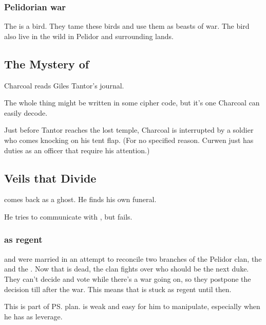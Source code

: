 \begin{garbage}
\subsubsection{Pelidorian war \grulcans}
The  is a \hs{\grulcan} bird. They tame these birds and use them as beasts of war. The bird also live in the wild in Pelidor and surrounding lands. 













\subsection{The Mystery of \EreshKal}
Charcoal reads Giles Tantor's journal. 

The whole thing might be written in some cipher code, but it's one Charcoal can easily decode. 

Just before Tantor reaches the lost temple, Charcoal is interrupted by a soldier who comes knocking on his tent flap. (For no specified reason. Curwen just has duties as an officer that require his attention.)







\subsection{Veils that Divide} 
\Icor{} comes back as a ghost. 
He finds his own funeral. 

He tries to communicate with \Tiroco, but fails.





\subsubsection{\Tiroco{} as regent}
\Tiroco{} and \Icor{} were married in an attempt to reconcile two branches of the Pelidor clan, the \Malcurians{} and the \Forkliners. 
Now that \Icor{} is dead, the clan fights over who should be the next duke. 
They can't decide and vote while there's a war going on, so they postpone the decision till after the war. 
This means that \Tiroco{} is stuck as regent until then. 

This is part of \ps{\Psyrex}{} plan. 
\Tiroco{} is weak and easy for him to manipulate, especially when he has \Icor{} as leverage. 








\end{garbage}
